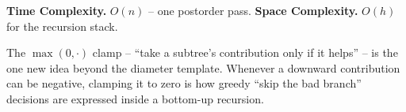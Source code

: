 \begin{complexitybox}
\textbf{Time Complexity.} $O(n)$ -- one postorder pass. \textbf{Space
Complexity.} $O(h)$ for the recursion stack.
\end{complexitybox}

\begin{takeawaybox}
The $\max(0,\cdot)$ clamp -- ``take a subtree's contribution only if it
helps'' -- is the one new idea beyond the diameter template. Whenever a
downward contribution can be negative, clamping it to zero is how greedy
``skip the bad branch'' decisions are expressed inside a bottom-up
recursion.
\end{takeawaybox}
